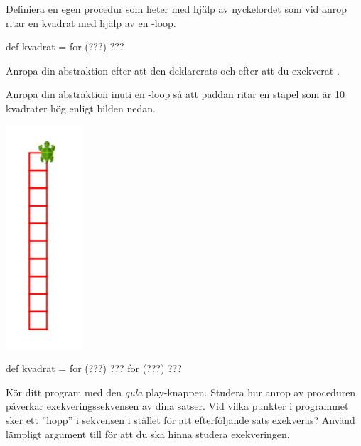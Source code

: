 
\Subtask Definiera en egen procedur som heter  med hjälp av nyckelordet  som vid anrop ritar en kvadrat med hjälp av en -loop. 

\begin{Code}
def kvadrat = for (???) {???}
\end{Code}


\Subtask Anropa din abstraktion efter att den deklarerats och efter att du exekverat .


\Subtask Anropa din abstraktion inuti en -loop så att paddan ritar en stapel som är 10 kvadrater hög enligt bilden nedan.


\begin{multicols}{2}

\includegraphics[scale=0.5]{../img/kojo/square-column}

\columnbreak

\begin{Code}
def kvadrat = for (???) {???}
for (???) {???}
\end{Code}

\end{multicols}

\Subtask Kör ditt program med den \emph{gula} play-knappen. Studera hur anrop av proceduren  påverkar exekveringssekvensen av dina satser. Vid vilka punkter i programmet sker ett ''hopp'' i sekvensen i stället för att efterföljande sats exekveras? Använd lämpligt argument till  för att du ska hinna studera exekveringen.


